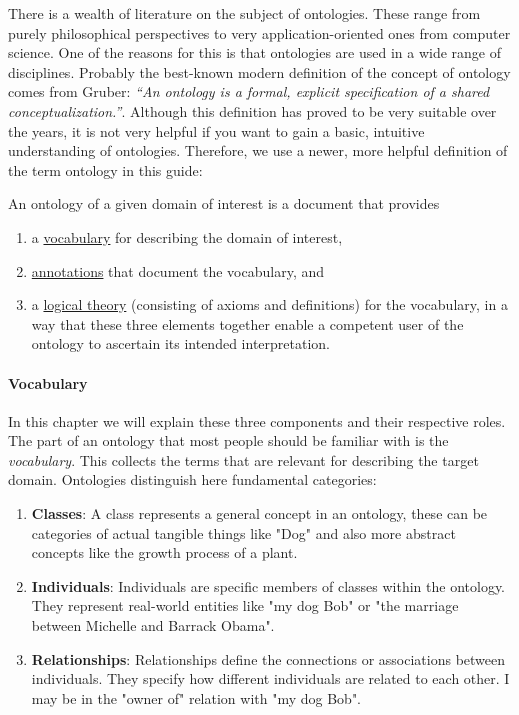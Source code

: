 There is a wealth of literature on the subject of ontologies. These range from purely philosophical perspectives to very application-oriented ones from computer science. One of the reasons for this is that ontologies are used in a wide range of disciplines. Probably the best-known modern definition of the concept of ontology comes from Gruber\cite{gruber1993ontology,studer1998knowledge}: \textit{``An ontology is a formal, explicit specification of a shared conceptualization.''}. Although this definition has proved to be very suitable over the years, it is not very helpful if you want to gain a basic, intuitive understanding of ontologies. Therefore, we use a newer, more helpful definition of the term ontology in this guide:

\begin{definition}
    An ontology of a given domain of interest is a document
that provides
\begin{enumerate}
    \label{def:ontology_2}
    \item  a \underline{vocabulary} for describing the domain of interest,
    \item  \underline{annotations} that document the vocabulary, and
    \item  a \underline{logical theory} (consisting of axioms and definitions) for the vocabulary,
in a way that these three elements together enable a competent user of the
ontology to ascertain its intended interpretation.

\end{enumerate}
\end{definition}

\paragraph{Vocabulary}

In this chapter we will explain these three components and their respective roles. The part of an ontology that most people should be familiar with is the \textit{vocabulary}. This collects the terms that are relevant for describing the target domain. Ontologies distinguish here fundamental categories:
\begin{enumerate}
    \item \textbf{Classes}: A class represents a general concept in an ontology, these can be categories of actual tangible things like "Dog" and also more abstract concepts like the growth process of a plant.
    
    \item \textbf{Individuals}: Individuals are specific members of classes within the ontology. They represent real-world entities like "my dog Bob" or "the marriage between Michelle and Barrack Obama".
    
    \item \textbf{Relationships}: Relationships define the connections or associations between individuals. They specify how different individuals are related to each other. I may be in the "owner of" relation with "my dog Bob".
\end{enumerate}

